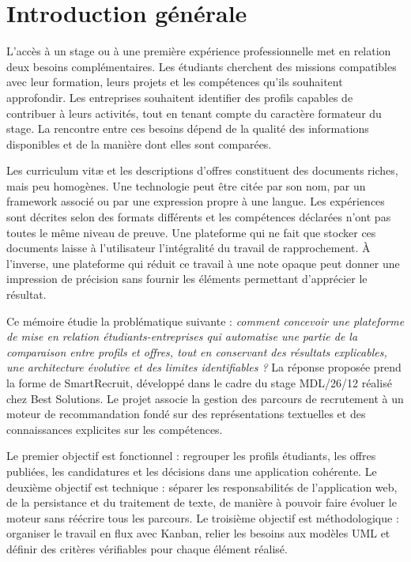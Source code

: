 \chapter*{Introduction générale}
L'accès à un stage ou à une première expérience professionnelle met en relation deux besoins complémentaires. Les étudiants cherchent des missions compatibles avec leur formation, leurs projets et les compétences qu'ils souhaitent approfondir. Les entreprises souhaitent identifier des profils capables de contribuer à leurs activités, tout en tenant compte du caractère formateur du stage. La rencontre entre ces besoins dépend de la qualité des informations disponibles et de la manière dont elles sont comparées.

Les curriculum vitæ et les descriptions d'offres constituent des documents riches, mais peu homogènes. Une technologie peut être citée par son nom, par un framework associé ou par une expression propre à une langue. Les expériences sont décrites selon des formats différents et les compétences déclarées n'ont pas toutes le même niveau de preuve. Une plateforme qui ne fait que stocker ces documents laisse à l'utilisateur l'intégralité du travail de rapprochement. À l'inverse, une plateforme qui réduit ce travail à une note opaque peut donner une impression de précision sans fournir les éléments permettant d'apprécier le résultat.

Ce mémoire étudie la problématique suivante : \emph{comment concevoir une plateforme de mise en relation étudiants-entreprises qui automatise une partie de la comparaison entre profils et offres, tout en conservant des résultats explicables, une architecture évolutive et des limites identifiables ?} La réponse proposée prend la forme de SmartRecruit, développé dans le cadre du stage MDL/26/12 réalisé chez Best Solutions. Le projet associe la gestion des parcours de recrutement à un moteur de recommandation fondé sur des représentations textuelles et des connaissances explicites sur les compétences.

Le premier objectif est fonctionnel : regrouper les profils étudiants, les offres publiées, les candidatures et les décisions dans une application cohérente. Le deuxième objectif est technique : séparer les responsabilités de l'application web, de la persistance et du traitement de texte, de manière à pouvoir faire évoluer le moteur sans réécrire tous les parcours. Le troisième objectif est méthodologique : organiser le travail en flux avec Kanban, relier les besoins aux modèles UML et définir des critères vérifiables pour chaque élément réalisé.

